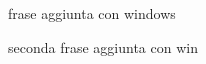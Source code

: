 \documentclass[a4paper]{article}
\begin{document}
frase aggiunta con windows

seconda frase aggiunta con win
\end{document}
